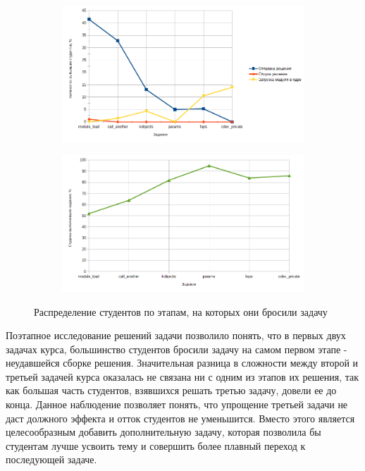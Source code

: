 \documentclass[a4paper,12pt]{article}
\begin{document}
\begin{figure}
	\centering
	\begin{subfigure}{.5\textwidth}
		\centering
		\includegraphics[width=\textwidth]{steps.png}
		\caption{}
		\label{fig:sub1}
	\end{subfigure}%
	\begin{subfigure}{.5\textwidth}
		\centering
		\includegraphics[width=\linewidth]{last_steps.png}
		\caption{}
		\label{fig:sub2}
	\end{subfigure}
	\caption{Распределение студентов по этапам, на которых они бросили задачу}
	\label{fig:mesh3}
\end{figure}

Поэтапное исследование решений задачи позволило понять, что в первых двух задачах курса, большинство студентов бросили задачу на самом первом этапе - неудавшейся сборке решения. Значительная разница в сложности между второй и третьей задачей курса оказалась не связана ни с одним из этапов их решения, так как большая часть студентов, взявшихся решать третью задачу, довели ее до конца. Данное наблюдение позволяет понять, что упрощение третьей задачи не даст должного эффекта и отток студентов не уменьшится. Вместо этого является целесообразным добавить дополнительную задачу, которая позволила бы студентам лучше усвоить тему и совершить более плавный переход к последующей задаче.
\end{document}

